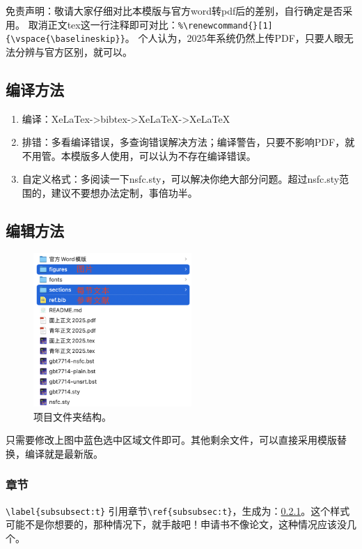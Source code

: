 
免责声明：敬请大家仔细对比本模版与官方word转pdf后的差别，自行确定是否采用。
取消正文tex这一行注释即可对比：\verb|%\renewcommand{}[1]|\\
\verb|{\vspace{\baselineskip}}|。
个人认为，2025年系统仍然上传PDF，只要人眼无法分辨与官方区别，就可以。

\subsection{编译方法}
\begin{enumerate}
	\item 编译：XeLaTex->bibtex->XeLaTeX->XeLaTeX
	\item 排错：多看编译错误，多查询错误解决方法；编译警告，只要不影响PDF，就不用管。本模版多人使用，可以认为不存在编译错误。
	\item 自定义格式：多阅读一下nsfc.sty，可以解决你绝大部分问题。超过nsfc.sty范围的，建议不要想办法定制，事倍功半。
\end{enumerate}


\subsection{编辑方法}
\vspace{-5pt}

\begin{figure}[h!]
	\centering %
	\includegraphics[width=6cm]{figures/xiugai.png}
	\captionsetup{justification=centering} %
	\caption{项目文件夹结构。}
\end{figure}
只需要修改上图中蓝色选中区域文件即可。其他剩余文件，可以直接采用模版替换，编译就是最新版。

\subsubsection{章节}\label{subsubsec:t}
\verb|\label{subsubsect:t}|
引用章节\verb|\ref{subsubsec:t}|，生成为：\ref{subsubsec:t}。这个样式可能不是你想要的，那种情况下，就手敲吧！申请书不像论文，这种情况应该没几个。

